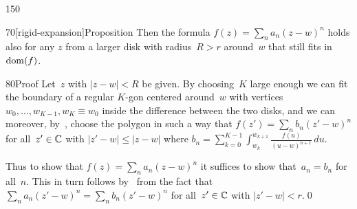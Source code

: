 \begin{parsec}{150}
\begin{point}{70}[rigid-expansion]{Proposition}
Then the formula $f(z)=\sum_n a_n (z-w)^n$
holds also for any $z$ from a larger disk 
with radius~$R>r$
around~$w$ that still fits in~$\operatorname{dom}(f)$.
\begin{point}{80}{Proof}%
Let~$z$ with $\left|z-w\right|<R$ be given.
By choosing~$K$ large enough
we can fit the boundary of a regular $K$-gon
centered around~$w$
with vertices $w_0,\dotsc,w_{K-1},w_{K}\equiv w_0$
inside the difference between the two disks,
and we can moreover, by~,
choose the polygon
in such a way that
$f(z')=\sum_n b_n (z'-w)^n$
for all~$z'\in\mathbb{C}$
with $\left|z'-w\right|\leq \left|z-w\right|$
where $b_n = \sum_{k=0}^{K-1}
\int_{w_k}^{w_{k+1}}
\frac{f(u)}{(u-w)^{n+1}}\,du$.

Thus to show that $f(z)=\sum_n a_n (z-w)^n$
it suffices to show that~$a_n=b_n$ for all~$n$.
This in turn
follows by~ from the fact
that $\sum_n a_n (z'-w)^n
= \sum_n b_n (z'-w)^n$
for all~$z'\in \mathbb{C}$ with $\left|z'-w\right|<r$.\qed
\end{point}
\end{point}
\end{parsec}
